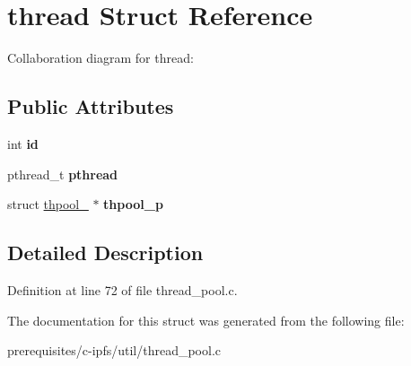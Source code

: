 \hypertarget{structthread}{}\section{thread Struct Reference}
\label{structthread}


Collaboration diagram for thread\+:
\subsection*{Public Attributes}
\begin{DoxyCompactItemize}
\item 
\mbox{\label{structthread_a179c3787ca24dc339fa88d610f93c620}} 
int {\bfseries id}
\item 
\mbox{\label{structthread_ade33d76baf20e29b1d29c3aa098996e4}} 
pthread\+\_\+t {\bfseries pthread}
\item 
\mbox{\label{structthread_a8c6bd5bb67f188e570f90c66141e0477}} 
struct \mbox{\hyperlink{structthpool__}{thpool\+\_\+}} $\ast$ {\bfseries thpool\+\_\+p}
\end{DoxyCompactItemize}


\subsection{Detailed Description}


Definition at line 72 of file thread\+\_\+pool.\+c.



The documentation for this struct was generated from the following file\+:\begin{DoxyCompactItemize}
\item 
prerequisites/c-\/ipfs/util/thread\+\_\+pool.\+c\end{DoxyCompactItemize}
